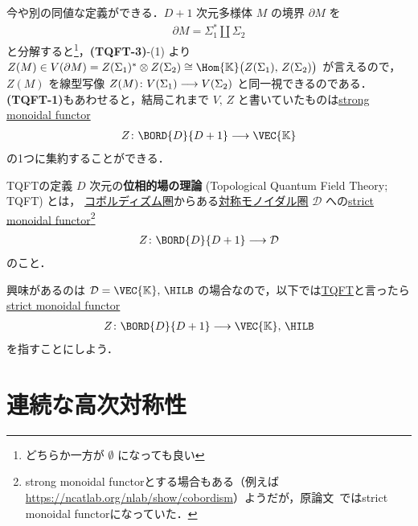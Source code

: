 \documentclass[TQFT_main]{subfiles}
\begin{document}
今や別の同値な定義ができる．$D+1$ 次元多様体 $M$ の境界 $\partial M$ を
\begin{align}
    \partial M = \Sigma_1^* \amalg \Sigma_2
\end{align}
と分解すると\footnote{どちらか一方が $\emptyset$ になっても良い}，\textsf{\textbf{(TQFT-3)}}-(1) より
$Z(M) \in V(\partial M) = Z(\Sigma_1)^* \otimes Z(\Sigma_2) \cong \Hom{\mathbb{K}} \bigl( Z(\Sigma_1),\, Z(\Sigma_2) \bigr)$ が言えるので，$Z(M)$ を線型写像 $Z(M) \colon V(\Sigma_1) \longrightarrow V(\Sigma_2)$ と同一視できるのである．
\textsf{\textbf{(TQFT-1)}}もあわせると，結局これまで $V,\, Z$ と書いていたものは\hyperref[def:monidal-functor]{strong monoidal functor}
\begin{align}
    Z \colon \BORD{D}{D+1}\lto \VEC{\mathbb{K}}
\end{align}
の1つに集約することができる．

\begin{mydef}[label=def:TQFT]{TQFTの定義}
    $D$ 次元の\textbf{位相的場の理論} (Topological Quantum Field Theory; TQFT) とは，
    \hyperref[Cob-string]{コボルディズム圏}からある\hyperref[def:braided-monoidal]{対称モノイダル圏} $\mathcal{D}$ への\hyperref[def:monidal-functor]{strict monoidal functor}\footnote{strong monoidal functorとする場合もある（例えば\url{https://ncatlab.org/nlab/show/cobordism}）ようだが，原論文~\cite{Atiyah1988tqft}ではstrict monoidal functorになっていた．}
    \begin{align}
        Z \colon \BORD{D}{D+1}\lto \mathcal{D}
    \end{align}
    のこと．
\end{mydef}

興味があるのは $\mathcal{D} = \VEC{\mathbb{K}},\, \HILB$ の場合なので，以下では\hyperref[ax:Atiyah-TQFT]{TQFT}と言ったら\hyperref[def:monidal-functor]{strict monoidal functor}
\begin{align}
    Z \colon \BORD{D}{D+1}\lto \VEC{\mathbb{K}},\, \HILB
\end{align}
を指すことにしよう．

\section{連続な高次対称性}
\end{document}
